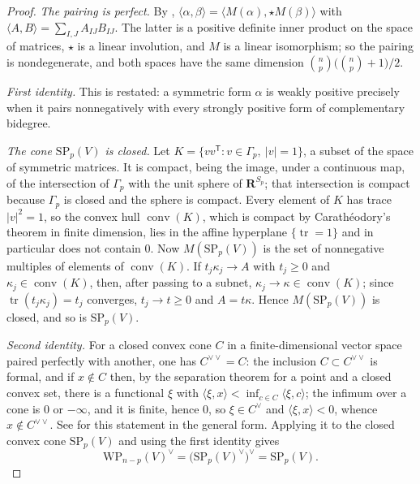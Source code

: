 \begin{proof}
\emph{The pairing is perfect.}  By
,
$\langle\alpha,\beta\rangle=\langle M(\alpha),\star M(\beta)\rangle$ with
$\langle A,B\rangle=\sum_{I,J}A_{IJ}B_{IJ}$.  The latter is a positive
definite inner product on the space of matrices, $\star$ is a linear
involution, and $M$ is a linear isomorphism; so the pairing is nondegenerate,
and both spaces have the same dimension $\binom np\bigl(\binom np+1\bigr)/2$.

\emph{First identity.}  This is  restated: a symmetric
form $\alpha$ is weakly positive precisely when it pairs nonnegatively with
every strongly positive form of complementary bidegree.

\emph{The cone $\mathrm{SP}_p(V)$ is closed.}  Let
$K=\{vv^{\mathsf T}:v\in\Gamma_p,\ |v|=1\}$, a subset of the space of
symmetric matrices.  It is compact, being the image, under a continuous map,
of the intersection of $\Gamma_p$ with the unit sphere of
$\mathbf R^{S_p}$; that intersection is compact because $\Gamma_p$ is closed
and the sphere is compact.  Every element of $K$ has trace
$|v|^2=1$, so the convex hull $\operatorname{conv}(K)$, which is compact by
Carath\'eodory's theorem in finite dimension, lies in the affine hyperplane
$\{\operatorname{tr}=1\}$ and in particular does not contain $0$.  Now
$M(\mathrm{SP}_p(V))$ is the set of nonnegative multiples of elements of
$\operatorname{conv}(K)$.  If $t_j\kappa_j\to A$ with $t_j\geq0$ and
$\kappa_j\in\operatorname{conv}(K)$, then, after passing to a subnet,
$\kappa_j\to\kappa\in\operatorname{conv}(K)$; since
$\operatorname{tr}(t_j\kappa_j)=t_j$ converges, $t_j\to t\geq0$ and
$A=t\kappa$.  Hence $M(\mathrm{SP}_p(V))$ is closed, and so is
$\mathrm{SP}_p(V)$.

\emph{Second identity.}  For a closed convex cone $C$ in a finite-dimensional
vector space paired perfectly with another, one has $C^{\vee\vee}=C$: the
inclusion $C\subset C^{\vee\vee}$ is formal, and if $x\notin C$ then, by the
separation theorem for a point and a closed convex set, there is a functional
$\xi$ with $\langle\xi,x\rangle<\inf_{c\in C}\langle\xi,c\rangle$; the
infimum over a cone is $0$ or $-\infty$, and it is finite, hence $0$, so
$\xi\in C^\vee$ and $\langle\xi,x\rangle<0$, whence $x\notin C^{\vee\vee}$.
See \cite[Theorem~14.1]{Roc70} for this statement in the general form.
Applying it to the closed convex cone $\mathrm{SP}_p(V)$ and using the first
identity gives
\[
 \mathrm{WP}_{n-p}(V)^\vee
 =\bigl(\mathrm{SP}_{p}(V)^\vee\bigr)^\vee
 =\mathrm{SP}_p(V).
\]


\end{proof}
